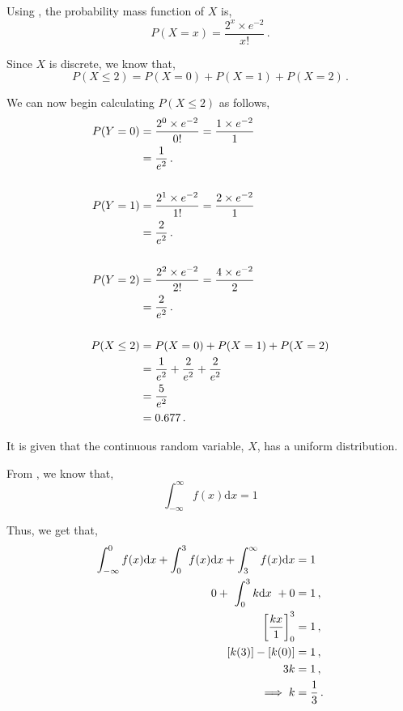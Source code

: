 \begin{subquestions}
Using , the probability mass function of $X$ is,
\begin{equation}
	P(X=x)= \frac{2^x \times e^{-2}}{x!} \,.
\end{equation}

Since $X$ is discrete, we know that,
\begin{equation}
	P(X \leq 2) = P(X=0)+P(X=1)+P(X=2) \,.
\end{equation}

We can now begin calculating $P(X \leq 2)$ as follows,
\begin{align}
	P(Y=0) & = \frac{2^0 \times e^{-2}}{0!} 
             = \frac{1 \times e^{-2}}{1} \nonumber \\
	       & = \frac{1}{e^2} \,. \\	\nonumber \\
	P(Y=1) & = \frac{2^1 \times e^{-2}}{1!} 
	         = \frac{2 \times e^{-2}}{1} \nonumber \\
	       & = \frac{2}{e^2} \,. \\	\nonumber \\       
	P(Y=2) & = \frac{2^2 \times e^{-2}}{2!} 
	         = \frac{4 \times e^{-2}}{2} \nonumber \\
	       & = \frac{2}{e^2} \,. \\ \nonumber \\     
	P(X \leq 2) & = P(X=0)+P(X=1)+P(X=2) \nonumber \\
	            & = \frac{1}{e^2} + \frac{2}{e^2} + \frac{2}{e^2} \nonumber \\
	            & = \frac{5}{e^2} \nonumber \\
	            & = 0.677 \,. 
\end{align}


\subquestion

It is given that the continuous random variable, $X$, has a uniform distribution.

\begin{subsubquestions}
	
\subsubquestion

From , we know that,
\begin{equation}
	\int_{-\infty}^{\infty} f(x)\mathrm{d}x = 1
\end{equation}

Thus, we get that,
\begin{align}
	\int_{-\infty}^{0} f(x)\mathrm{d}x + \int_{0}^{3} f(x)\mathrm{d}x + \int_{3}^{\infty} f(x)\mathrm{d}x & = 1 \nonumber \\
	0 + ~\int_{0}^{3} k\mathrm{d}x ~+ 0 & = 1 \,, \nonumber \\
	\left[\frac{kx}{1} \right]_0^3 & = 1 \,, \nonumber \\
	[k(3)]-[k(0)] & = 1 \,, \nonumber \\
	3k & = 1 \,, \nonumber \\
	\implies k & = \frac{1}{3} \,.
\end{align}


\end{subsubquestions}
\end{subquestions}
